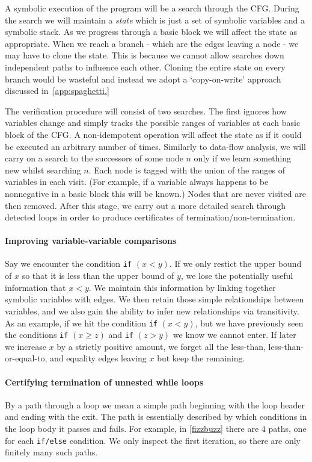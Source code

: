 \documentclass[12pt,a4paper]{article}
\begin{document}
A symbolic execution of the program will be a search through the CFG. During the search we will maintain a \textit{state} which is just a set of symbolic variables and a symbolic stack. As we progress through a basic block we will affect the state as appropriate. 
When we reach a branch - which are the edges leaving a node - we may have to clone the state. This is because we cannot allow searches down independent paths to influence each other. Cloning the entire state on every branch would be wasteful and instead we adopt a `copy-on-write' approach discussed in~\cref{app:spaghetti.}

The verification procedure will consist of two searches. The first ignores how variables change and simply tracks the possible ranges of variables at each basic block of the CFG. A non-idempotent operation will affect the state as if it could be executed an arbitrary number of times. Similarly to data-flow analysis, we will carry on a search to the successors of some node $n$ only if we learn something new whilst searching $n$. Each node is tagged with the union of the ranges of variables in each visit. (For example, if a variable always happens to be nonnegative in a basic block this will be known.) Nodes that are never visited are then removed. After this stage, we carry out a more detailed
search through detected loops in order to produce certificates of termination/non-termination.

\paragraph{Improving variable-variable comparisons}
Say we encounter the condition \texttt{if} $(x < y)$. If we only restict the upper bound of $x$ so that it is less than the upper bound of $y$, we lose the potentially useful information that $x < y$.
We maintain this information by linking together symbolic variables with edges. We then retain those simple relationships between variables, and we also gain the ability to infer new relationships via transitivity.
As an example, if we hit the condition \texttt{if} $(x < y)$, but we have previously seen the conditions \texttt{if} $(x \geq z)$ and \texttt{if} $(z > y)$ we know we cannot enter.
If later we increase $x$ by a strictly positive amount, we forget all the less-than, less-than-or-equal-to, and equality edges leaving $x$ but keep the remaining.

\paragraph{Certifying termination of unnested while loops}\label{par:loops}
By a path through a loop we mean a simple path beginning with the loop header and ending with the exit. The path is essentially described by which conditions
in the loop body it passes and fails. For example, in \cref{fizzbuzz} there are $4$ paths, one for each \texttt{if/else} condition. We only inspect the first iteration, so there are only finitely many such paths.
\end{document}
